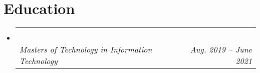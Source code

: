 \documentclass[letterpaper,11pt]{article}
\makeatletter
\newcommand{\resumeItem}[1]{
  \item\small{
    {#1 \vspace{-2pt}}
  }
}
\newcommand{\resumeSubheading}[4]{
  \vspace{-2pt}\item
    \begin{tabular*}{0.97\textwidth}[t]{l@{\extracolsep{\fill}}r}
      \textbf{#1} & #2 \\
      \textit{\small#3} & \textit{\small #4} \\
    \end{tabular*}\vspace{-7pt}
}
\newcommand{\resumeProjectHeading}[2]{
    \item
    \begin{tabular*}{0.97\textwidth}{l@{\extracolsep{\fill}}r}
      \small#1 & #2 \\
    \end{tabular*}\vspace{-7pt}
}
\newcommand{\resumeSubHeadingListStart}{\begin{itemize}[leftmargin=0.15in, label={}]}
\newcommand{\resumeSubHeadingListEnd}{\end{itemize}}
\newcommand{\resumeItemListStart}{\begin{itemize}}
\newcommand{\resumeItemListEnd}{\end{itemize}\vspace{-5pt}}
\makeatother
\begin{document}
\section{Education}
  \resumeSubHeadingListStart
    \resumeSubheading
      {\mastersUNI\ }{\mastersAdd\ }
      {Masters of Technology in Information Technology}{Aug. 2019 -- June 2021}
  \resumeSubHeadingListEnd


%



\end{document}
